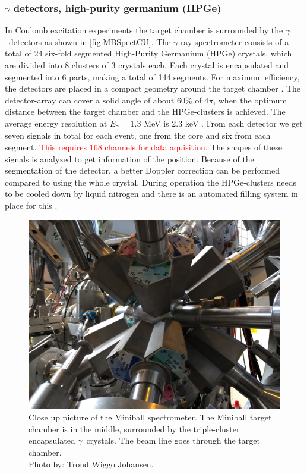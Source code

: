 \documentclass[twoside,english]{uiofysmaster/uiofysmaster}
\newcommand{\ga}{$\gamma$}
\begin{document}
\subsubsection{\texorpdfstring{$\gamma$}{Gamma} detectors, high-purity germanium (HPGe)}
In Coulomb excitation experiments the target chamber is surrounded by the \ga\ detectors as shown in \autoref{fig:MBSpectCU}. The \ga-ray spectrometer consists of a total of 24 six-fold segmented High-Purity Germanium (HPGe) crystals, which are divided into 8 clusters of 3 crystals each. Each crystal is encapsulated and segmented into 6 parts, making a total of 144 segments. For maximum efficiency, the detectors are placed in a compact geometry around the target chamber \cite{NWarr-HPGe, MB-spect}. The detector-array can cover a solid angle of about 60\% of 4$\pi$, when the optimum distance between the target chamber and the HPGe-clusters is achieved. The average energy resolution at $E_\gamma = 1.3$ MeV is 2.3 keV \cite{Butler2017}. From each detector we get seven signals in total for each event, one from the core and six from each segment. \textcolor{red}{This requires 168 channels for data aquisition.} The shapes of these signals is analyzed to get information of the position. Because of the segmentation of the detector, a better Doppler correction can be performed compared to using the whole crystal. During operation the HPGe-clusters needs to be cooled down by liquid nitrogen and there is an automated filling system in place for this \cite{NWarr-HPGe}. 

\begin{figure}[ht]
	\centering
	\includegraphics[width=\linewidth]{Images/IMG3917.JPG}
	\caption{Close up picture of the Miniball spectrometer. The Miniball target chamber is in the middle, surrounded by the triple-cluster encapsulated \ga\ crystals. The beam line goes through the target chamber. \\ Photo by: Trond Wiggo Johansen.}
	\label{fig:MBSpectCU}
\end{figure}
\end{document}
